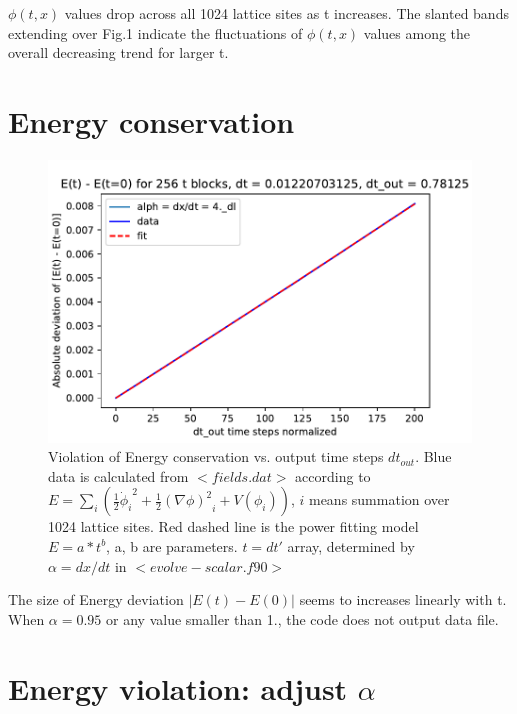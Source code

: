 \documentclass{article}
\begin{document}
$\phi(t, x)$ values drop across all 1024 lattice sites as t increases. The slanted bands extending over Fig.1 indicate the fluctuations of $\phi(t, x)$ values among the overall decreasing trend for larger t.

\section{Energy conservation}

\begin{figure}[H]
    \centering
    \includegraphics[scale=0.7]{E_dev_alph=4}
    \caption{Violation of Energy conservation vs. output time steps $dt_{out}$. Blue data is calculated from $<fields.dat>$ according to $E=\sum_i(\frac{1}{2}{\dot\phi_i}^2+\frac{1}{2}{(\nabla{\phi})^2}_i+V(\phi_i))$, $i$ means summation over 1024 lattice sites. Red dashed line is the power fitting model $E = a*{t}^b$, a, b are parameters. $t=dt'$ array, determined by $\alpha=dx/dt$ in $<evolve-scalar.f90>$}
    \label{fig:Q4}
\end{figure}

The size of Energy deviation $|E(t) - E(0)|$ seems to increases linearly with t. When $\alpha = 0.95$ or any value smaller than 1., the code does not output data file. 

\section{Energy violation: adjust $\alpha$}
\end{document}
